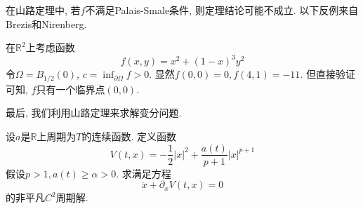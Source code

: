 \begin{example}
    在山路定理中, 若$f$不满足Palais-Smale条件, 则定理结论可能不成立. 以下反例来自Brezis和Nirenberg.
    
    在$\mathbb{R}^2$上考虑函数 
    \begin{equation*}
        f(x, y) = x^2 + (1 - x)^3y^2
    \end{equation*}
    令$\Omega = B_{1/2}(0)$, $c = \inf_{\partial\Omega}f > 0$. 显然$f(0, 0) = 0, f(4, 1) = -11$.
    但直接验证可知, $f$只有一个临界点$(0, 0)$.
\end{example}

最后, 我们利用山路定理来求解变分问题.

\begin{example}
    设$a$是$\mathbb{R}$上周期为$T$的连续函数. 定义函数 
    \begin{equation*}
        V(t, x) = -\frac{1}{2}|x|^2 + \frac{a(t)}{p + 1}|x|^{p + 1}
    \end{equation*}
    假设$p > 1, a(t) \geq \alpha > 0$. 求满足方程 
    \begin{equation}\label{58}
        \ddot x + \partial_xV(t, x) = 0
    \end{equation}
    的非平凡$C^2$周期解.


\end{example}
